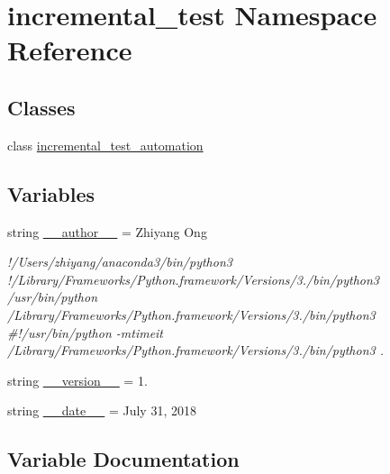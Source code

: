 \hypertarget{namespaceincremental__test}{}\section{incremental\+\_\+test Namespace Reference}
\label{namespaceincremental__test}
\subsection*{Classes}
\begin{DoxyCompactItemize}
\item 
class \hyperlink{classincremental__test_1_1incremental__test__automation}{incremental\+\_\+test\+\_\+automation}
\end{DoxyCompactItemize}
\subsection*{Variables}
\begin{DoxyCompactItemize}
\item 
string \hyperlink{namespaceincremental__test_a5f6427d0e520c9febabce9161afb249b}{\+\_\+\+\_\+author\+\_\+\+\_\+} = \textquotesingle{}Zhiyang Ong\textquotesingle{}
\begin{DoxyCompactList}\small\item\em !/\+Users/zhiyang/anaconda3/bin/python3 !/\+Library/\+Frameworks/\+Python.framework/\+Versions/3./bin/python3 /usr/bin/python /\+Library/\+Frameworks/\+Python.framework/\+Versions/3./bin/python3 \#!/usr/bin/python -\/mtimeit /\+Library/\+Frameworks/\+Python.framework/\+Versions/3./bin/python3 . \end{DoxyCompactList}\item 
string \hyperlink{namespaceincremental__test_a0f94dd1f320b9558e27a5809d2041c4c}{\+\_\+\+\_\+version\+\_\+\+\_\+} = \textquotesingle{}1.\textquotesingle{}
\item 
string \hyperlink{namespaceincremental__test_afce713750b4dd215527495dfc84d047e}{\+\_\+\+\_\+date\+\_\+\+\_\+} = \textquotesingle{}July 31, 2018\textquotesingle{}
\end{DoxyCompactItemize}


\subsection{Variable Documentation}
\hypertarget{namespaceincremental__test_a5f6427d0e520c9febabce9161afb249b}{}
